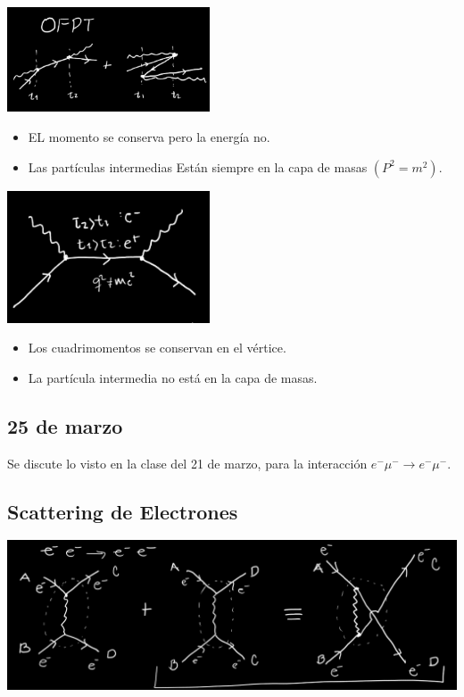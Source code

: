 \documentclass[a4paper,12pt]{article}
\begin{document}
\begin{minipage}{0.9\textwidth}
\begin{multicols}{2}
\includegraphics[width=6cm]{6321.png}

\begin{itemize}
    \item EL momento se conserva pero la energía no.
    \item  Las partículas  intermedias Están siempre en la capa de masas $( P^2 =m ^2)$. 
\end{itemize}
\newpage
\includegraphics[width=6cm]{7321.png}


\begin{itemize}
    \item Los cuadrimomentos se conservan en el vértice. 
    \item La partícula intermedia no está en la capa de masas.
\end{itemize}
\end{multicols}


\end{minipage}


\subsection*{25 de marzo }

Se discute lo visto en la clase del 21 de marzo, para la interacción $\boxed{e^- \mu ^- \to e^- \mu^- }$. 
\subsection{ Scattering de Electrones}
\begin{minipage}{0.9\textwidth}
\includegraphics[width=0.90 \textwidth]{C2503/01.png}
\end{minipage}
\end{document}

